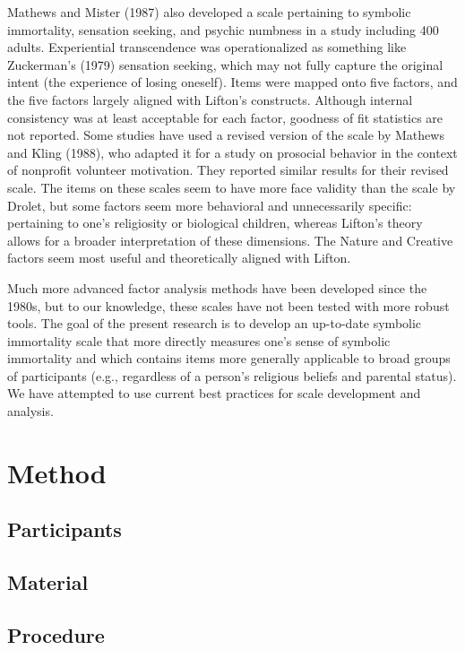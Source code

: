 \documentclass[
  man]{apa6}
\begin{document}
Mathews and Mister (1987) also developed a scale pertaining to symbolic
immortality, sensation seeking, and psychic numbness in a study
including 400 adults. Experiential transcendence was operationalized as
something like Zuckerman's (1979) sensation seeking, which may not fully
capture the original intent (the experience of losing oneself). Items
were mapped onto five factors, and the five factors largely aligned with
Lifton's constructs. Although internal consistency was at least
acceptable for each factor, goodness of fit statistics are not reported.
Some studies have used a revised version of the scale by Mathews and
Kling (1988), who adapted it for a study on prosocial behavior in the
context of nonprofit volunteer motivation. They reported similar results
for their revised scale. The items on these scales seem to have more
face validity than the scale by Drolet, but some factors seem more
behavioral and unnecessarily specific: pertaining to one's religiosity
or biological children, whereas Lifton's theory allows for a broader
interpretation of these dimensions. The Nature and Creative factors seem
most useful and theoretically aligned with Lifton.

Much more advanced factor analysis methods have been developed since the
1980s, but to our knowledge, these scales have not been tested with more
robust tools. The goal of the present research is to develop an
up-to-date symbolic immortality scale that more directly measures one's
sense of symbolic immortality and which contains items more generally
applicable to broad groups of participants (e.g., regardless of a
person's religious beliefs and parental status). We have attempted to
use current best practices for scale development and analysis.

\section{Method}\label{method}

\subsection{Participants}\label{participants}

\subsection{Material}\label{material}

\subsection{Procedure}\label{procedure}
\end{document}
